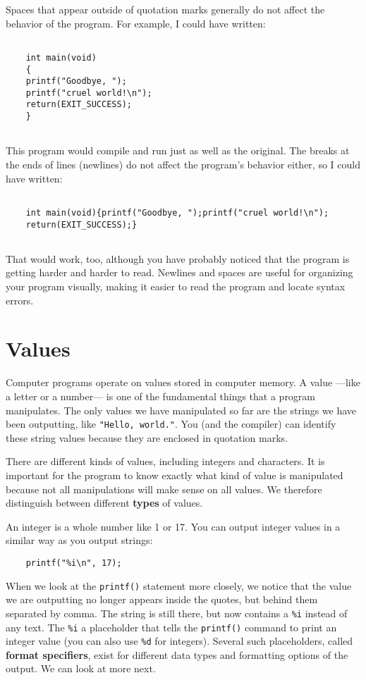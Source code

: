 Spaces that appear outside of quotation marks generally do
not affect the behavior of the program.  For example, I
could have written:

\begin{verbatim}

    int main(void)
    {
    printf("Goodbye, ");
    printf("cruel world!\n");	     
    return(EXIT_SUCCESS);
    }
    
\end{verbatim}
%
This program would compile and run just as well as the original.
The breaks at the ends of lines (newlines) do not affect
the program's behavior either, so I could have written:

\begin{verbatim}

    int main(void){printf("Goodbye, ");printf("cruel world!\n");
    return(EXIT_SUCCESS);}
    
\end{verbatim}
%
That would work, too, although you have probably noticed that
the program is getting harder and harder to read.  Newlines and
spaces are useful for organizing your program visually, making
it easier to read the program and locate syntax errors.

\section{Values}

Computer programs operate on values stored in 
computer memory.
A value ---like a letter or
a number--- is one of the fundamental things that a program manipulates.  
The only values we have
manipulated so far are the strings we have been outputting, like
{\tt "Hello, world."}.  You (and the compiler) can identify
these string values because they are enclosed in quotation marks.

There are different kinds of values, including integers and characters.
It is important for the program to know exactly what kind of value
is manipulated because not all manipulations will make sense on all
values.
We therefore distinguish between different {\bf types} of values.  

An integer is a whole number like 1 or 17.  You can output
integer values in a similar way as you output strings:

\begin{verbatim}
    printf("%i\n", 17);
\end{verbatim}
%
When we look at the \texttt{printf()} statement more closely, we
notice that the value we are outputting no longer appears
inside the quotes, but behind them separated by comma.
The string is still there, but now contains a {\tt \%i} instead of
any text. 
The {\tt \%i} a placeholder that tells the \texttt{printf()} command
to print an integer value (you can also use {\tt \%d} for integers). 
Several such placeholders, called {\bf format specifiers}, exist
for different data types and formatting options of the output. 
We can look at more next.

